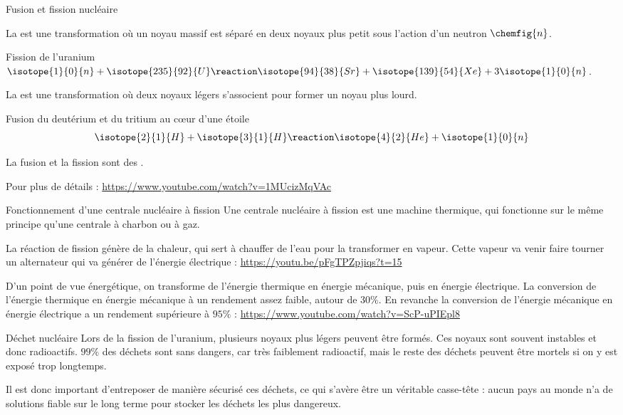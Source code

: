 \begin{doc}{Fusion et fission nucléaire}
  \vspace*{-20pt}
  \begin{encart}
    La  est une transformation où un noyau massif est séparé en deux noyaux plus petit sous l'action d'un neutron $\chemfig{n}$.
  \end{encart}
  \exemple Fission de l'uranium $\isotope{1}{0}{n} + \isotope{235}{92}{U} \reaction \isotope{94}{38}{Sr} + \isotope{139}{54}{Xe} + 3\isotope{1}{0}{n}$.
  
  \begin{encart}
    La  est une transformation où deux noyaux légers s'associent pour former un noyau plus lourd.
  \end{encart}
  \exemple Fusion du deutérium et du tritium au c\oe{}ur d'une étoile
  \begin{equation*}
    \isotope{2}{1}{H} + \isotope{3}{1}{H} \reaction \isotope{4}{2}{He} + \isotope{1}{0}{n}
  \end{equation*}
  
  \begin{encart}
    La fusion et la fission sont des .
  \end{encart}
  
  Pour plus de détails : \url{https://www.youtube.com/watch?v=1MUcizMqVAc}
\end{doc}

\begin{doc}{Fonctionnement d'une centrale nucléaire à fission}
  Une centrale nucléaire à fission est une machine thermique, qui fonctionne sur le même principe qu'une centrale à charbon ou à gaz.
  
  La réaction de fission génère de la chaleur, qui sert à chauffer de l'eau pour la transformer en vapeur.
  Cette vapeur va venir faire tourner un alternateur qui va générer de l'énergie électrique : \url{https://youtu.be/pFgTPZpjiqs?t=15}
  \bigskip
  
  D'un point de vue énergétique, on transforme de l'énergie thermique en énergie mécanique, puis en énergie électrique.
  La conversion de l'énergie thermique en énergie mécanique à un rendement assez faible, autour de $30\%$.
  En revanche la conversion de l'énergie mécanique en énergie électrique a un rendement supérieure à $95 \%$ : \url{https://www.youtube.com/watch?v=ScP-uPIEpl8}
\end{doc}


\begin{doc}{Déchet nucléaire}
  Lors de la fission de l'uranium, plusieurs noyaux plus légers peuvent être formés.
  Ces noyaux sont souvent instables et donc radioactifs.
  $99 \%$ des déchets sont sans dangers, car très faiblement radioactif, mais le reste des déchets peuvent être mortels si on y est exposé trop longtemps.
  
  Il est donc important d'entreposer de manière sécurisé ces déchets, ce qui s'avère être un véritable casse-tête : aucun pays au monde n'a de solutions fiable sur le long terme pour stocker les déchets les plus dangereux.
\end{doc}


